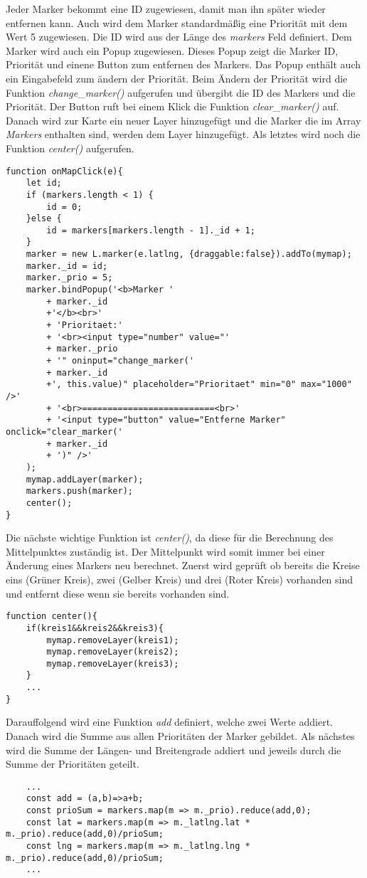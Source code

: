 \documentclass[a4paper, twoside, 12pt]{scrreprt}
\begin{document}
Jeder Marker bekommt eine ID zugewiesen, damit man ihn später wieder entfernen kann.
Auch wird dem Marker standardmäßig eine Priorität mit dem Wert 5 zugewiesen.
Die ID wird aus der Länge des \textit{markers} Feld definiert.
Dem Marker wird auch ein Popup zugewiesen.
Dieses Popup zeigt die Marker ID, Priorität und einene Button zum entfernen des Markers.
Das Popup enthält auch ein Eingabefeld zum ändern der Priorität.
Beim Ändern der Priorität wird die Funktion \textit{change}\_\textit{marker()} aufgerufen und übergibt die ID des Markers und die Priorität.
Der Button ruft bei einem Klick die Funktion \textit{clear}\_\textit{marker()} auf.
Danach wird zur Karte ein neuer Layer hinzugefügt und die Marker die im Array \textit{Markers} enthalten sind, werden dem Layer hinzugefügt.
Als letztes wird noch die Funktion \textit{center()} aufgerufen.
\begin{lstlisting}
function onMapClick(e){
	let id;
	if (markers.length < 1) {
		id = 0;
	}else {
		id = markers[markers.length - 1]._id + 1;
	}
	marker = new L.marker(e.latlng, {draggable:false}).addTo(mymap);
	marker._id = id;
	marker._prio = 5;
	marker.bindPopup('<b>Marker '
		+ marker._id
		+'</b><br>'
    	+ 'Prioritaet:'
		+ '<br><input type="number" value="'
		+ marker._prio
		+ '" oninput="change_marker('
		+ marker._id
		+', this.value)" placeholder="Prioritaet" min="0" max="1000" />'
		+ '<br>==========================<br>'
		+ '<input type="button" value="Entferne Marker" onclick="clear_marker('
		+ marker._id
		+ ')" />'
	);
	mymap.addLayer(marker);
	markers.push(marker);
	center();
}
\end{lstlisting}
Die nächste wichtige Funktion ist \textit{center()}, da diese für die Berechnung des Mittelpunktes zuständig ist. Der Mittelpunkt wird somit immer bei einer Änderung eines Markers neu berechnet.
Zuerst wird geprüft ob bereits die Kreise eins (Grüner Kreis), zwei (Gelber Kreis) und drei (Roter Kreis) vorhanden sind und entfernt diese wenn sie bereits vorhanden sind.
\begin{lstlisting}
function center(){
	if(kreis1&&kreis2&&kreis3){
		mymap.removeLayer(kreis1);
		mymap.removeLayer(kreis2);
		mymap.removeLayer(kreis3);
	}
	...
}
\end{lstlisting}
Darauffolgend wird eine Funktion \textit{add} definiert, welche zwei Werte addiert. Danach wird die Summe aus allen Prioritäten der Marker gebildet. Als nächstes wird die Summe der Längen- und Breitengrade addiert und jeweils durch die Summe der Prioritäten geteilt.
\begin{lstlisting}
	...
	const add = (a,b)=>a+b;
	const prioSum = markers.map(m => m._prio).reduce(add,0);
	const lat = markers.map(m => m._latlng.lat * m._prio).reduce(add,0)/prioSum;
	const lng = markers.map(m => m._latlng.lng * m._prio).reduce(add,0)/prioSum;
	...
\end{lstlisting}
\end{document}
